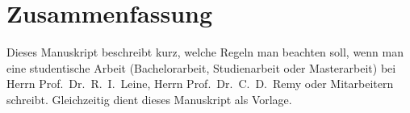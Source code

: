 \chapter*{Zusammenfassung}
Dieses Manuskript beschreibt kurz, welche Regeln man beachten soll, wenn man
eine studentische Arbeit (Bachelorarbeit, Studienarbeit oder Masterarbeit) bei Herrn Prof.~Dr.~R.~I.~Leine, Herrn Prof.~Dr.~C.~D.~Remy oder Mitarbeitern schreibt. Gleichzeitig dient dieses Manuskript als Vorlage.